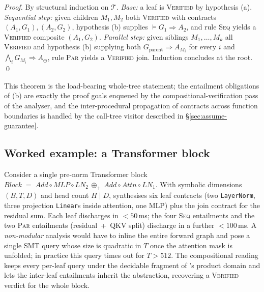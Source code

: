 \begin{proof}
By structural induction on $\mathcal{T}$.
\emph{Base:} a leaf is \textsc{Verified} by hypothesis (a).
\emph{Sequential step:} given children $M_1,M_2$ both
\textsc{Verified} with contracts $(A_1,G_1),(A_2,G_2)$, hypothesis
(b) supplies $\models G_1\!\Rightarrow\!A_2$, and rule \textsc{Seq}
yields a \textsc{Verified} composite $(A_1,G_2)$.
\emph{Parallel step:} given siblings $M_1,\dots,M_k$ all
\textsc{Verified} and hypothesis (b) supplying both
$G_{\text{parent}}\!\Rightarrow\!A_{M_i}$ for every $i$ and
$\bigwedge_i G_{M_i}\!\Rightarrow\!A_\oplus$, rule \textsc{Par} yields
a \textsc{Verified} join. Induction concludes at the root.
\qed
\end{proof}

This theorem is the load-bearing whole-tree statement;
the entailment obligations of (b) are exactly the proof goals
enqueued by the compositional-verification pass of the
analyser, and the inter-procedural propagation of contracts
across function boundaries is handled by the call-tree visitor
described in \S\ref{sec:assume-guarantee}.

\subsection{Worked example: a Transformer block}
\label{sec:ag:example}

Consider a single pre-norm Transformer block
$\mathit{Block} \;=\; \mathit{Add}\circ \mathit{MLP}\circ\mathit{LN}_2
\,\oplus_{+}\, \mathit{Add}\circ\mathit{Attn}\circ\mathit{LN}_1$.
With symbolic dimensions $(B,T,D)$ and head count $H\!\mid\!D$,
 synthesises six leaf contracts (two
\texttt{LayerNorm}, three projection \texttt{Linear}s inside attention,
one MLP) plus the join contract for the residual sum. Each leaf
discharges in $<\!50$\,ms; the four \textsc{Seq} entailments and the
two \textsc{Par} entailments (residual~+~QKV split) discharge in a
further $<\!100$\,ms. A \emph{non-modular} analysis would have to
inline the entire forward graph and pose a single SMT query whose size
is quadratic in $T$ once the attention mask is unfolded; in practice
this query times out for $T\!>\!512$. The compositional reading
keeps every per-leaf query under the decidable
fragment of \citet{cousot1977abstract}'s product domain and lets the
inter-leaf entailments inherit the abstraction, recovering a
\textsc{Verified} verdict for the whole block.
